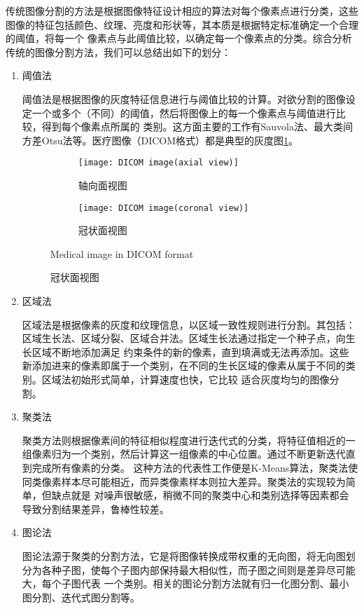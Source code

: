 	传统图像分割的方法是根据图像特征设计相应的算法对每个像素点进行分类，这些图像的特征包括颜色、纹理、亮度和形状等，其本质是根据特定标准确定一个合理的阈值，将每一个
	像素点与此阈值比较，以确定每一个像素点的分类。综合分析传统的图像分割方法，我们可以总结出如下的划分：
	\begin{enumerate}
		\item 阈值法
		
		阈值法是根据图像的灰度特征信息进行与阈值比较的计算。对欲分割的图像设定一个或多个（不同）的阈值，然后将图像上的每一个像素点与阈值进行比较，得到每个像素点所属的
		类别。这方面主要的工作有Sauvola法\cite{sauvola2000adaptive}、最大类间方差Otsu法\cite{otsu1979threshold}等。医疗图像（DICOM格式\cite{mustra2008overview}）都是典型的灰度图\ref{fig:medical_image}。
		\begin{figure}[!htp]
			\centering
			\begin{subfigure}{\textwidth}
				\centering
				\texttt{[image: DICOM image(axial view)]}
				\caption{轴向面视图}
			\end{subfigure}
			
			\vspace{2mm}
			
			\begin{subfigure}{\textwidth}
				\centering
				\texttt{[image: DICOM image(coronal view)]}
				\caption{冠状面视图}
			\end{subfigure}
				{Medical image in DICOM format}
			\label{fig:medical_image}
		\end{figure}
		
		\item 区域法
		
		区域法是根据像素的灰度和纹理信息，以区域一致性规则进行分割。其包括：区域生长法、区域分裂、区域合并法。区域生长法通过指定一个种子点，向生长区域不断地添加满足
		约束条件的新的像素，直到填满或无法再添加。这些新添加进来的像素即属于一个类别，在不同的生长区域的像素从属于不同的类别。区域法初始形式简单，计算速度也快，它比较
		适合灰度均匀的图像分割。
		
		\item 聚类法
		
		聚类方法则根据像素间的特征相似程度进行迭代式的分类，将特征值相近的一组像素归为一个类别，然后计算这一组像素的中心位置。通过不断更新迭代直到完成所有像素的分类。
		这种方法的代表性工作便是K-Means算法\cite{macqueen1965some}，聚类法使同类像素样本尽可能相近，而异类像素样本则拉大差异。聚类法的实现较为简单，但缺点就是
		对噪声很敏感，稍微不同的聚类中心和类别选择等因素都会导致分割结果差异，鲁棒性较差。
		
		\item 图论法
		
		图论法源于聚类的分割方法，它是将图像转换成带权重的无向图，将无向图划分为各种子图，使每个子图内部保持最大相似性，而子图之间则是差异尽可能大，每个子图代表
		一个类别。相关的图论分割方法就有归一化图分割、最小图分割、迭代式图分割等。
	\end{enumerate}
	

